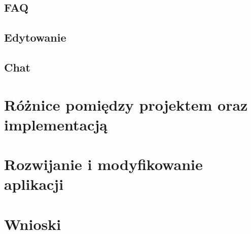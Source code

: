 \subsection{FAQ}
\label{sec:faq}

\subsection{Edytowanie}
\label{sec:edit}

\subsection{Chat}
\label{sec:chat}



\section{Różnice pomiędzy projektem oraz implementacją}
\label{sec:roznice}



\section{Rozwijanie i modyfikowanie aplikacji}
\label{sec:rozwoj}



\section{Wnioski}
\label{sec:doswiadczenia}

